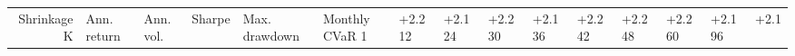 \begin{tabular}{rlllllll}
\toprule
Shrinkage K & Ann. return & Ann. vol. & Sharpe & Max. drawdown & Monthly CVaR 1%
 & +2.2%
12 & +2.1%
24 & +2.2%
30 & +2.1%
36 & +2.2%
42 & +2.2%
48 & +2.2%
60 & +2.1%
96 & +2.1%
\bottomrule
\end{tabular}
